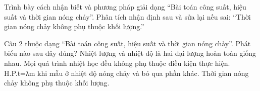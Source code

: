 \begin{bt}
Trình bày cách nhận biết và phương pháp giải dạng “Bài toán công suất, hiệu suất và thời gian nóng chảy”. Phân tích nhận định sau và sửa lại nếu sai: “Thời gian nóng chảy không phụ thuộc khối lượng.”
\end{bt}

\begin{ex}
Câu 2 thuộc dạng “Bài toán công suất, hiệu suất và thời gian nóng chảy”. Phát biểu nào sau đây đúng?
\choice
{Nhiệt lượng và nhiệt độ là hai đại lượng hoàn toàn giống nhau.}
{Mọi quá trình nhiệt học đều không phụ thuộc điều kiện thực hiện.}
{\True H.P.t=λm khi mẫu ở nhiệt độ nóng chảy và bỏ qua phần khác.}
{Thời gian nóng chảy không phụ thuộc khối lượng.}
\end{ex}

